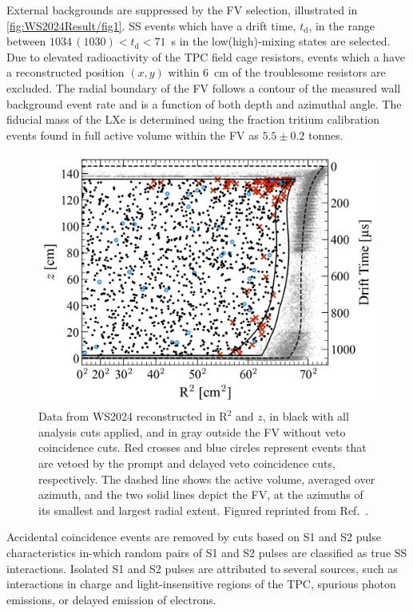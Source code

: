 External backgrounds are suppressed by the FV selection, illustrated in \autoref{fig:WS2024Result/fig1}. SS events which have a drift time, $t_\text{d}$, in the range between $1034\,(1030)<t_\text{d}<71$~\textmu s in the low(high)-mixing states are selected. Due to elevated radioactivity of the TPC field cage resistors, events which a have a reconstructed position $(x,y)$ within 6~cm of the troublesome resistors are excluded. The radial boundary of the FV follows a contour of the measured wall background event rate and is a function of both depth and azimuthal angle. The fiducial mass of the LXe is determined using the fraction tritium calibration events found in full active volume within the FV as $5.5\pm0.2$ tonnes.
\begin{figure}[t!]
    \centering
    \includegraphics[width=0.7\linewidth]{figures/WS2024Result/figure1.png}
    \caption[Data from WS2024 reconstructed in $\text{R}^2$ and $z$ in the TPC.]{Data from WS2024 reconstructed in $\text{R}^2$ and $z$, in black with all analysis cuts applied, and in gray outside the FV without veto coincidence cuts. Red crosses and blue circles represent events that are vetoed by the prompt and delayed veto coincidence cuts, respectively. The dashed line shows the active volume, averaged over azimuth, and the two solid lines depict the FV, at the azimuths of its smallest and largest radial extent. Figured reprinted from Ref.~\cite{LZCollaboration:2024lux}.}
    \label{fig:WS2024Result/fig1}
\end{figure}
Accidental coincidence events are removed by cuts based on S1 and S2 pulse characteristics in-which random pairs of S1 and S2 pulses are classified as true SS interactions. Isolated S1 and S2 pulses are attributed to several sources, such as interactions in charge and light-insensitive regions of the TPC, spurious photon emissions, or delayed emission of electrons.


